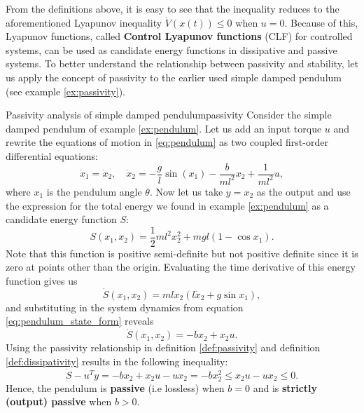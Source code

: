 From the definitions above, it is easy to see that the inequality reduces to the aforementioned Lyapunov inequality $\dot{ V }\left( x \left( t \right)\right)\le 0$ when $u = 0$. Because of this, Lyapunov functions, called \textbf{Control Lyapunov functions} (CLF) for controlled systems, can be used as candidate energy functions in dissipative and passive systems. To better understand the relationship between passivity and stability, let us apply the concept of passivity to the earlier used simple damped pendulum (see example \ref{ex:passivity}).

\begin{example}{Passivity analysis of simple damped pendulum}{passivity}
  Consider the simple damped pendulum of example \ref{ex:pendulum}. Let us add an input torque $u$ and rewrite the equations of motion in \eqref{eq:pendulum} as two coupled first-order differential equations:
  \begin{equation} \label{eq:pendulum_state_form}
    \dot{x}_1 = \dot{x}_2, \quad \dot{x}_2 = -\frac{g}{l} \sin(x_1) - \frac{b}{ml^2}x_2 + \frac{1}{ml^2}u,
  \end{equation}
  where $x_1$ is the pendulum angle $\theta$. Now let us take $y = x_2$ as the output and use the expression for the total energy we found in example \ref{ex:pendulum} as a candidate energy function $S$:
  \begin{equation}
    S \left(x_1, x_2 \right) = \frac{1}{2} m l^2 x_2^2 + mgl(1 - \cos{x_1}).
  \end{equation}
  Note that this function is positive semi-definite but not positive definite since it is zero at points other than the origin. Evaluating the time derivative of this energy function gives us
  \begin{equation}
    \dot{S}\left(x_1, x_2\right) = ml x_2 \left( l \dot{x}_2 + g \sin{x_1}\right),
  \end{equation}
  and substituting in the system dynamics from equation \eqref{eq:pendulum_state_form} reveals
  \begin{equation}
    \dot{S}\left(x_1, x_2 \right) = -b x_2 + x_2 u.
  \end{equation}
  Using the passivity relationship in definition \ref{def:passivity} and definition \ref{def:dissipativity} results in the following inequality:
  \begin{equation}
    \dot{S} - u^T y = -b x_2 + x_2 u - u x_2 = -b x_ 2^2 \le x_2 u - u x_2 \le 0.
  \end{equation}
  Hence, the pendulum is \textbf{passive} (i.e lossless) when $b = 0$ and is \textbf{strictly (output) passive} when $b > 0$.
\end{example}

